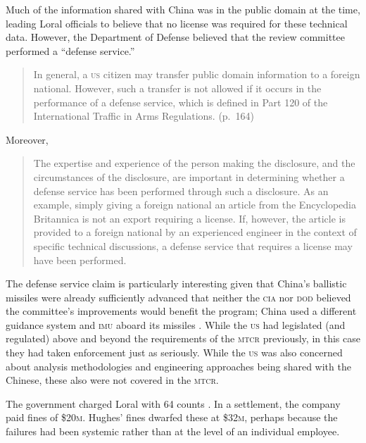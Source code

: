\documentclass[12pt]{olfmemo}
\begin{document}
Much of the information shared with China was in the public domain at the time, leading Loral officials to believe that no license was required for these technical data. However, the Department of Defense believed that the review committee performed a ``defense service.''
\begin{quote}
In general, a \textsc{us} citizen may transfer public domain information to a foreign national. However, such a transfer is not allowed if it occurs in the performance of a defense service, which is defined in Part 120 of the International Traffic in Arms Regulations. (p.~164)
\end{quote}
Moreover,
\begin{quote}
The expertise and experience of the person making the disclosure, and the circumstances of the disclosure, are important in determining whether a defense service has been performed through such a disclosure. As an example, simply giving a foreign national an article from the Encyclopedia Britannica is not an export requiring a license. If, however, the article is provided to a foreign national by an experienced engineer in the context of specific technical discussions, a defense service that requires a license may have been performed. \cite{Cox1999}
\end{quote}

The defense service claim is particularly interesting given that China's ballistic missiles were already sufficiently advanced that neither the \textsc{cia} nor \textsc{dod} believed the committee's improvements would benefit the program; China used a different guidance system and \textsc{imu} aboard its missiles \citep{Cox1999}. While the \textsc{us} had legislated (and regulated) above and beyond the requirements of the \textsc{mtcr} previously, in this case they had taken enforcement just as seriously. While the \textsc{us} was also concerned about analysis methodologies and engineering approaches being shared with the Chinese, these also were not covered in the \textsc{mtcr}.

The government charged Loral with 64 counts \citep{Marquis2002}. In a settlement, the company paid fines of \$20\textsc{m}. Hughes' fines dwarfed these at \$32\textsc{m}, perhaps because the failures had been systemic rather than at the level of an individual employee.
\end{document}
